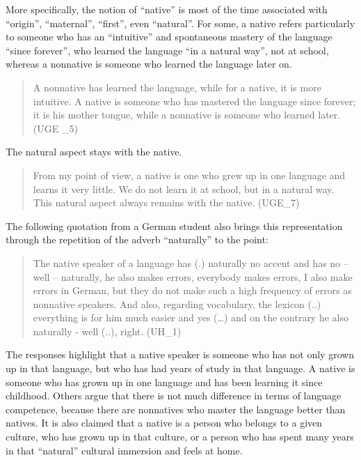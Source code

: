 \documentclass[output=paper]{../langscibook}
\begin{document}
More specifically, the notion of “native” is most of the time associated with “origin”, “maternal”, “first”, even “natural”. For some, a native refers particularly to someone who has an “intuitive” and spontaneous mastery of the language “since forever”, who learned the language “in a natural way”, not at school, where\-as a nonnative is someone who learned the language later on. 

\begin{quote}
A nonnative has learned the language, while for a native, it is more intuitive. A native is someone who has mastered the language since forever; it is his mother tongue, while a nonnative is someone who learned later. (UGE \_5)
\end{quote}

\noindent The natural aspect stays with the native.

\begin{quote}
From my point of view, a native is one who grew up in one language and learns it very little. We do not learn it at school, but in a natural way. This natural aspect always remains with the native. (UGE\_7)
\end{quote}

The following quotation from a German student also brings this representation through the repetition of the adverb “naturally” to the point:

\begin{quote}
The native speaker of a language has (.) naturally no accent and has no – well – naturally, he also makes errors, everybody makes errors, I also make errors in German, but they do not make such a high frequency of errors as nonnative speakers. And also, regarding vocabulary, the lexicon (..) everything is for him much easier  and yes (…) and on the contrary he also naturally - well (..), right. (UH\_1)
\end{quote}

The responses highlight that a native speaker is someone who has not only grown up in that language, but who has had years of study in that language. A native is someone who has grown up in one language and has been learning it since childhood. Others argue that there is not much difference in terms of language competence, because there are nonnatives who master the language better than natives. It is also claimed that a native is a person who belongs to a given culture, who has grown up in that culture, or a person who has spent many years in that “natural” cultural immersion and feels at home. 
\end{document}
